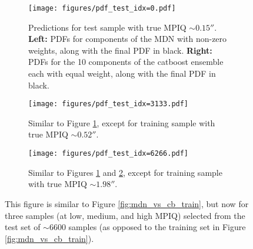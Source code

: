 \begin{figure*}
\begin{subfigure}{0.99\textwidth}
    \centering
    \texttt{[image: figures/pdf\_test\_idx=0.pdf]}
    \caption{Predictions for test sample with true MPIQ $\sim0.15''$. \textbf{Left:} PDFs for components of the MDN with non-zero weights, along with the final  PDF in black. \textbf{Right:} PDFs for the 10 components of the {\sc catboost} ensemble each with equal weight, along with the final  PDF in black.}
    \label{fig:mdn_vs_cb_test_low}
\end{subfigure}
\newline
\begin{subfigure}{0.99\textwidth}
    \centering
    \texttt{[image: figures/pdf\_test\_idx=3133.pdf]}
    \caption{Similar to Figure \ref{fig:mdn_vs_cb_test_low}, except for training sample with true MPIQ $\sim0.52''$.}
    \label{fig:mdn_vs_cb_test_med}
\end{subfigure}
\newline
\begin{subfigure}{0.99\textwidth}
    \centering
    \texttt{[image: figures/pdf\_test\_idx=6266.pdf]}
    \caption{Similar to Figures \ref{fig:mdn_vs_cb_test_low} and \ref{fig:mdn_vs_cb_test_med}, except for training sample with true MPIQ $\sim1.98''$.}
    \label{fig:mdn_vs_cb_test_high}
\end{subfigure}
\caption{This figure is similar to Figure \ref{fig:mdn_vs_cb_train}, but now for three samples (at low, medium, and high MPIQ) selected from the test set of $\sim6600$ samples (as opposed to the training set in Figure \ref{fig:mdn_vs_cb_train}).}
\label{fig:mdn_vs_cb_test}
\end{figure*}



